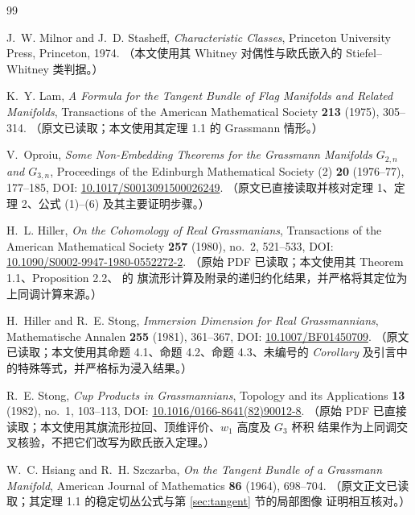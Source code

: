\begin{thebibliography}{99}

J.~W. Milnor and J.~D. Stasheff,
\emph{Characteristic Classes},
Princeton University Press, Princeton, 1974.
（本文使用其 Whitney 对偶性与欧氏嵌入的 Stiefel--Whitney 类判据。）

K.~Y. Lam,
\emph{A Formula for the Tangent Bundle of Flag Manifolds and Related
Manifolds},
Transactions of the American Mathematical Society \textbf{213} (1975),
305--314.
（原文已读取；本文使用其定理 1.1 的 Grassmann 情形。）

V.~Oproiu,
\emph{Some Non-Embedding Theorems for the Grassmann Manifolds $G_{2,n}$ and
$G_{3,n}$},
Proceedings of the Edinburgh Mathematical Society (2) \textbf{20}
(1976--77), 177--185,
DOI: \href{https://doi.org/10.1017/S0013091500026249}{10.1017/S0013091500026249}.
（原文已直接读取并核对定理 1、定理 2、公式 (1)--(6) 及其主要证明步骤。）

H.~L. Hiller,
\emph{On the Cohomology of Real Grassmanians},
Transactions of the American Mathematical Society \textbf{257} (1980),
no.~2, 521--533,
DOI: \href{https://doi.org/10.1090/S0002-9947-1980-0552272-2}%
{10.1090/S0002-9947-1980-0552272-2}.
（原始 PDF 已读取；本文使用其 Theorem 1.1、Proposition 2.2、 的
旗流形计算及附录的递归约化结果，并严格将其定位为上同调计算来源。）

H.~Hiller and R.~E. Stong,
\emph{Immersion Dimension for Real Grassmannians},
Mathematische Annalen \textbf{255} (1981), 361--367,
DOI: \href{https://doi.org/10.1007/BF01450709}{10.1007/BF01450709}.
（原文已读取；本文使用其命题 4.1、命题 4.2、命题 4.3、未编号的 \emph{Corollary}
及引言中的特殊等式，并严格标为浸入结果。）

R.~E. Stong,
\emph{Cup Products in Grassmannians},
Topology and its Applications \textbf{13} (1982), no.~1, 103--113,
DOI: \href{https://doi.org/10.1016/0166-8641(82)90012-8}%
{10.1016/0166-8641(82)90012-8}.
（原始 PDF 已直接读取；本文使用其旗流形拉回、顶维评价、$w_1$ 高度及 $G_3$ 杯积
结果作为上同调交叉核验，不把它们改写为欧氏嵌入定理。）

W.~C. Hsiang and R.~H. Szczarba,
\emph{On the Tangent Bundle of a Grassmann Manifold},
American Journal of Mathematics \textbf{86} (1964), 698--704.
（原文正文已读取；其定理 1.1 的稳定切丛公式与第 \ref{sec:tangent} 节的局部图像
证明相互核对。）

\end{thebibliography}
